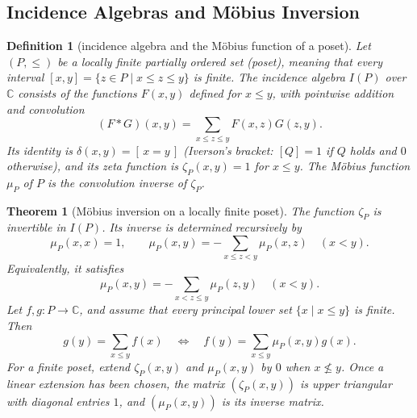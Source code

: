 \documentclass[11pt]{article}
\theoremstyle{ntstyle}
\newtheorem{theorem}{Theorem}[subsection]
\newtheorem{definition}{Definition}[subsection]
\begin{document}
\subsection{Incidence Algebras and M{\"o}bius Inversion}

\begin{definition}[incidence algebra and the M{\"o}bius function of a poset]\label{def:5.4.1} Let $(P,\le)$ be a locally finite partially ordered set (poset), meaning that every interval $[x,y]=\{z\in P \mid x\le z\le y\}$ is finite. The incidence algebra $I(P)$ over $\mathbb{C}$ consists of the functions $F(x,y)$ defined for $x\le y$, with pointwise addition and convolution
	\[
		(F*G)(x,y)=\sum_{x\le z\le y}F(x,z)G(z,y).
	\]
	Its identity is $\delta(x,y)=[\,x=y\,]$ (Iverson's bracket: $[Q]=1$ if $Q$ holds and $0$ otherwise), and its zeta function is $\zeta_P(x,y)=1$ for $x\le y$. The M{\"o}bius function $\mu_P$ of $P$ is the convolution inverse of $\zeta_P$.

\end{definition}
\begin{theorem}[M{\"o}bius inversion on a locally finite poset]\label{thm:5.4.1} The function $\zeta_P$ is invertible in $I(P)$. Its inverse is determined recursively by
	\[
		\mu_P(x,x)=1,\qquad
		\mu_P(x,y)=-\sum_{x\le z<y}\mu_P(x,z)\quad(x<y).
	\]
	Equivalently, it satisfies
	\[
		\mu_P(x,y)=-\sum_{x<z\le y}\mu_P(z,y)\quad(x<y).
	\]
	Let $f,g:P\to\mathbb{C}$, and assume that every principal lower set $\{x \mid x\le y\}$ is finite. Then
	\[
		g(y)=\sum_{x\le y}f(x)
		\quad\Longleftrightarrow\quad
		f(y)=\sum_{x\le y}\mu_P(x,y)g(x).
	\]
	For a finite poset, extend $\zeta_P(x,y)$ and $\mu_P(x,y)$ by $0$ when $x\nleq y$. Once a linear extension has been chosen, the matrix $(\zeta_P(x,y))$ is upper triangular with diagonal entries $1$, and $(\mu_P(x,y))$ is its inverse matrix.

\end{theorem}
\end{document}
